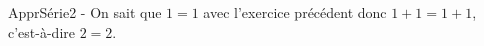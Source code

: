     ApprSérie2 - On sait que $1=1$ avec l’exercice précédent donc $1+1=1+1$,
    c’est-à-dire $2=2$.
